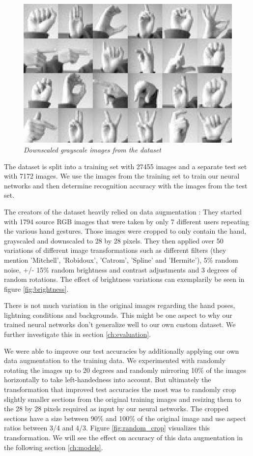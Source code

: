 \documentclass[a4paper]{article}
\begin{document}
\begin{figure}
     \centering
     \includegraphics[width=1\linewidth]{graphics/dataset/amer_sign3.png}
     \caption{\textit{Downscaled grayscale images from the dataset \cite{DatasetKaggle}}}
     \label{fig:full_grayscale}
\end{figure}

The dataset is split into a training set with 27455 images and a separate test set with 7172 images. We use the images from the training set to train our neural networks and then determine recognition accuracy with the images from the test set.

The creators of the dataset heavily relied on data augmentation \cite{DatasetKaggle}: They started with 1794 source RGB images that were taken by only 7 different users repeating the various hand gestures. Those images were cropped to only contain the hand, grayscaled and downscaled to 28 by 28 pixels. They then applied over 50 variations of different image transformations such as different filters (they mention 'Mitchell', 'Robidoux', 'Catrom', 'Spline' and 'Hermite'), 5\% random noise, +/- 15\% random brightness and contrast adjustments and 3 degrees of random rotations. The effect of brightness variations can exemplarily be seen in figure \ref{fig:brightness}.

There is not much variation in the original images regarding the hand poses, lightning conditions and backgrounds. This might be one aspect to why our trained neural networks don't generalize well to our own custom dataset. We further investigate this in section \ref{ch:evaluation}.

We were able to improve our test accuracies by additionally applying our own data augmentation to the training data. We experimented with randomly rotating the images up to 20 degrees and randomly mirroring 10\% of the images horizontally to take left-handedness into account. But ultimately the transformation that improved test accuracies the most was to randomly crop slightly smaller sections from the original training images and resizing them to the 28 by 28 pixels required as input by our neural networks. The cropped sections have a size between 90\% and 100\% of the original image and use aspect ratios between 3/4 and 4/3. Figure \ref{fig:random_crop} visualizes this transformation. We will see the effect on accuracy of this data augmentation in the following section \ref{ch:models}.
\end{document}
